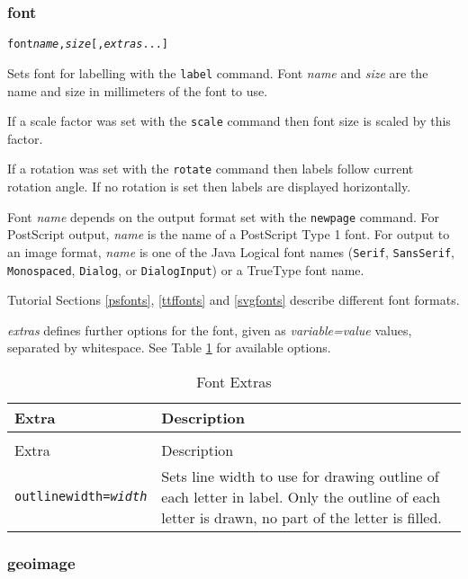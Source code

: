 \subsubsection{font}

\begin{alltt}
font \textit{name}, \textit{size} [, \textit{extras} ...]
\end{alltt}

Sets font for labelling with the \texttt{label} command.
Font \textit{name} and \textit{size} are the name and size in
millimeters of the font to use.

If a scale factor was set with the
\texttt{scale} command
then font size is scaled by this factor.

If a rotation was set with the
\texttt{rotate} command
then labels follow current rotation angle.
If no rotation is set then labels are displayed
horizontally.

Font \textit{name}
depends on the output format set with the
\texttt{newpage} command.
For PostScript output, \textit{name} is the name of a PostScript Type 1
font.
For output to an image format, \textit{name} is one of the Java Logical
font names (\texttt{Serif}, \texttt{SansSerif},
\texttt{Monospaced}, \texttt{Dialog}, or \texttt{DialogInput}) or a TrueType
font name.

Tutorial Sections \ref{psfonts}, \ref{ttffonts} and \ref{svgfonts}
describe different font formats.

\textit{extras} defines further options for the font, given as
\textit{variable=value} values, separated by whitespace.
See Table \ref{fontextras}
for available options.

\begin{longtable}{|l|p{7cm}|}
\hline
\label{fontextras}
Extra & Description \\
\hline
\hline
\endfirsthead
\hline
\caption{Font Extras} \\
\endfoot

\hline
Extra & Description \\
\hline
\hline
\endhead

\texttt{outlinewidth=\textit{width}} &

Sets line width to use for drawing outline of each letter in label.
Only the outline of each letter is drawn, no part of the letter is filled. \\

\hline
\end{longtable}

\subsubsection{geoimage}

